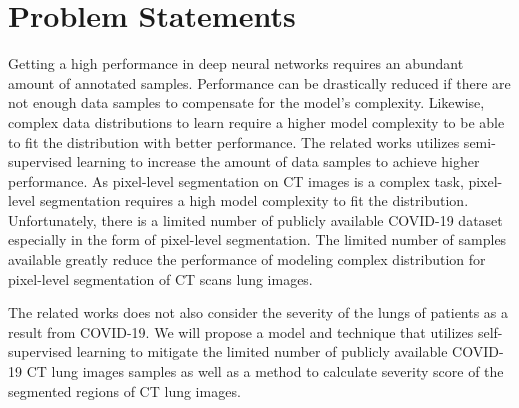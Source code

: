 \section{Problem Statements}
Getting a high performance in deep neural networks requires an abundant amount of annotated samples. Performance can be drastically reduced if there are not enough data samples to compensate for the model’s complexity. Likewise, complex data distributions to learn require a higher model complexity to be able to fit the distribution with better performance. The related works utilizes semi-supervised learning to increase the amount of data samples to achieve higher performance. As pixel-level segmentation on CT images is a complex task, pixel-level segmentation requires a high model complexity to fit the distribution. Unfortunately, there is a limited number of publicly available COVID-19 dataset especially in the form of pixel-level segmentation. The limited number of samples available greatly reduce the performance of modeling complex distribution for pixel-level segmentation of CT scans lung images.

The related works does not also consider the severity of the lungs of patients as a result from COVID-19. We will propose a model and technique that utilizes self-supervised learning to mitigate the limited number of publicly available COVID-19 CT lung images samples as well as a method to calculate severity score of the segmented regions of CT lung images. 
